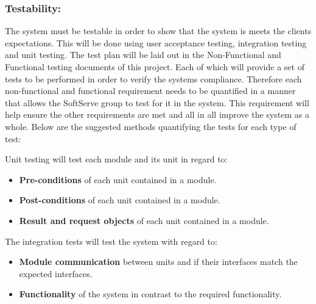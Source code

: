 \begin{flushleft}
\vspace{0.1in}

\subsubsection{Testability:}

\begin{flushleft}

The system must be testable in order to show that the system is meets the clients expectations. This will be done using user acceptance testing, integration testing and unit testing. The test plan will be laid out in the Non-Functional and Functional testing documents of this project. Each of which will provide a set of tests to be performed in order to verify the systems compliance. Therefore each non-functional and functional requirement needs to be quantified in a manner that allows the SoftServe group to test for it in the system. This requirement will help ensure the other requirements are met and all in all improve the system as a whole. Below are the suggested methods quantifying the tests for each type of test:\\


\vspace{0.1in}

Unit testing will test each module and its unit in regard to:
\begin{itemize}

\item\textbf{Pre-conditions} of each unit contained in a module.
\item\textbf{Post-conditions} of each unit contained in a module.
\item\textbf{Result and request objects} of each unit contained in a module.

\end{itemize}

The integration tests will test the system with regard to:

\begin{itemize}

\item \textbf{Module communication} between units and if their interfaces match the expected interfaces. 
\item \textbf{Functionality} of the system in contrast to the required functionality.


\end{itemize}
\end{flushleft}
\end{flushleft}
